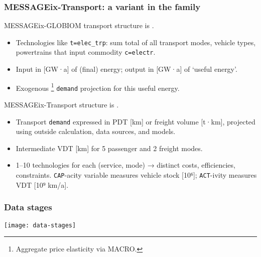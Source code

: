 \documentclass[12pt,aspectratio=169]{beamer}
\begin{document}
\begin{frame}
\frametitle{MESSAGEix-Transport: a variant in the family}

MESSAGEix-GLOBIOM transport structure is .
\begin{itemize}
  \item Technologies like \texttt{t=elec\_trp}: sum total of all transport modes, vehicle types, powertrains that input commodity \texttt{c=electr}.
  \item Input in [GW·a] of (final) energy; output in [GW·a] of ‘useful energy’.
  \item Exogenous%
  \footnote{Aggregate price elasticity via MACRO.}
  \texttt{demand} projection for this useful energy.
\end{itemize}

MESSAGEix-Transport structure is .
\begin{itemize}
  \item Transport \texttt{demand} expressed in PDT [km] or freight volume [t·km], projected using outside calculation, data sources, and models.
  \item Intermediate VDT [km] for 5 passenger and 2 freight modes.
  \item 1–10 technologies for each (service, mode) → distinct costs, efficiencies, constraints. \texttt{CAP}-acity variable measures vehicle stock [10⁶]; \texttt{ACT}-ivity measures VDT [10⁹ km/a].
\end{itemize}
\end{frame}

\begin{frame}
\frametitle{Data stages}
\texttt{[image: data-stages]}
\end{frame}
\end{document}
